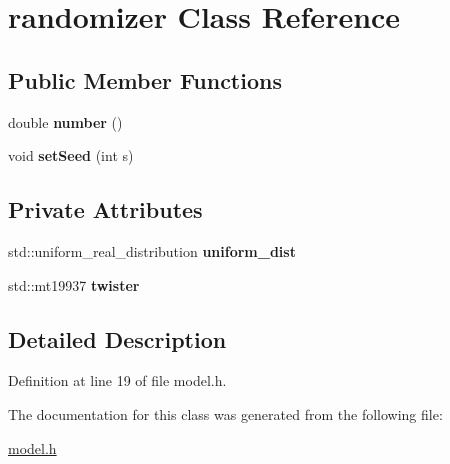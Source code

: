 \hypertarget{classrandomizer}{}\section{randomizer Class Reference}
\label{classrandomizer}
\subsection*{Public Member Functions}
\begin{DoxyCompactItemize}
\item 
\mbox{\label{classrandomizer_ae175fffeb1c48d064973e33b3e11b9a0}} 
double {\bfseries number} ()
\item 
\mbox{\label{classrandomizer_ad360ae291abce71d660ca8cadb344b00}} 
void {\bfseries set\+Seed} (int s)
\end{DoxyCompactItemize}
\subsection*{Private Attributes}
\begin{DoxyCompactItemize}
\item 
\mbox{\label{classrandomizer_a538d8fc8e95d8c64654d6b3354745194}} 
std\+::uniform\+\_\+real\+\_\+distribution {\bfseries uniform\+\_\+dist}
\item 
\mbox{\label{classrandomizer_a8c1820ea3c64a67bf48fca01cb68a310}} 
std\+::mt19937 {\bfseries twister}
\end{DoxyCompactItemize}


\subsection{Detailed Description}


Definition at line 19 of file model.\+h.



The documentation for this class was generated from the following file\+:\begin{DoxyCompactItemize}
\item 
\mbox{\hyperlink{model_8h}{model.\+h}}\end{DoxyCompactItemize}
